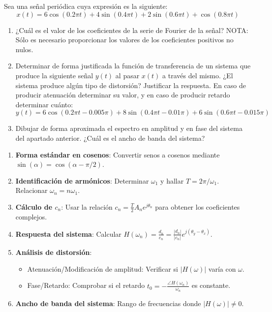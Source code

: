 \begin{problema}
Sea una señal periódica cuya expresión es la siguiente:
\[
x(t) = 6\cos(0.2\pi t) + 4\sin(0.4\pi t) + 2\sin(0.6\pi t) + \cos(0.8\pi t)
\]
\begin{enumerate}[label=\alph*)]
    \item ¿Cuál es el valor de los coeficientes de la serie de Fourier de la señal? NOTA: Sólo es necesario proporcionar los valores de los coeficientes positivos no nulos.
    \item Determinar de forma justificada la función de transferencia de un sistema que produce la siguiente señal $y(t)$ al pasar $x(t)$ a través del mismo. ¿El sistema produce algún tipo de distorsión? Justificar la respuesta. En caso de producir atenuación determinar su valor, y en caso de producir retardo determinar cuánto:
    \[
    y(t) = 6\cos(0.2\pi t - 0.005\pi) + 8\sin(0.4\pi t - 0.01\pi) + 6\sin(0.6\pi t - 0.015\pi)
    \]
    \item Dibujar de forma aproximada el espectro en amplitud y en fase del sistema del apartado anterior. ¿Cuál es el ancho de banda del sistema?
\end{enumerate}
\end{problema}

\begin{mecanizado}
\begin{enumerate}
    \item \textbf{Forma estándar en cosenos}: Convertir senos a cosenos mediante $\sin(\alpha) = \cos(\alpha - \pi/2)$.
    \item \textbf{Identificación de armónicos}: Determinar $\omega_1$ y hallar $T = 2\pi / \omega_1$. Relacionar $\omega_n = n \omega_1$.
    \item \textbf{Cálculo de $c_n$}: Usar la relación $c_n = \frac{T}{2} A_n e^{j\theta_n}$ para obtener los coeficientes complejos.
    \item \textbf{Respuesta del sistema}: Calcular $H(\omega_n) = \frac{d_n}{c_n} = \frac{|d_n|}{|c_n|} e^{j(\theta_y - \theta_x)}$.
    \item \textbf{Análisis de distorsión}:
    \begin{itemize}
        \item Atenuación/Modificación de amplitud: Verificar si $|H(\omega)|$ varía con $\omega$.
        \item Fase/Retardo: Comprobar si el retardo $t_0 = -\frac{\angle H(\omega_n)}{\omega_n}$ es constante.
    \end{itemize}
    \item \textbf{Ancho de banda del sistema}: Rango de frecuencias donde $|H(\omega)| \neq 0$.
\end{enumerate}
\end{mecanizado}

